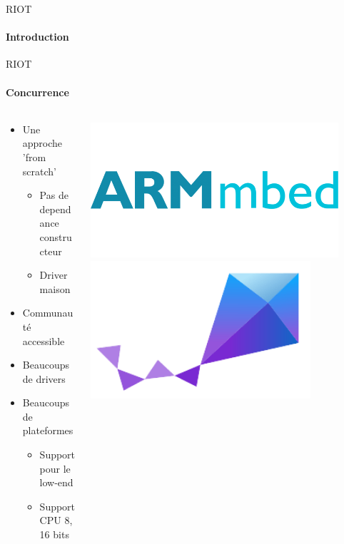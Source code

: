 \begin{frame}{RIOT}
\framesubtitle{Introduction}

\end{frame}

\begin{frame}{RIOT}
\framesubtitle{Concurrence}
\begin{columns}
\begin{column}{0.6\textwidth}
 \begin{itemize}
  \item Une approche 'from scratch'
  \begin{itemize}
    \item Pas de dependance constructeur
    \item Driver maison
  \end{itemize}
  \item Communauté accessible
  \item Beaucoups de drivers
  \item Beaucoups de plateformes
  \begin{itemize}
    \item Support pour le low-end
    \item Support CPU 8, 16 bits
  \end{itemize}
\end{itemize}
\end{column}
\begin{column}{0.4\textwidth}
\begin{center}
  \includegraphics[width=0.9\textwidth]{presentation.tex/fig/armmbed.png}
  \includegraphics[width=0.8\textwidth]{presentation.tex/fig/zephyr.png}
\end{center}
\end{column}
\end{columns}
\end{frame}

